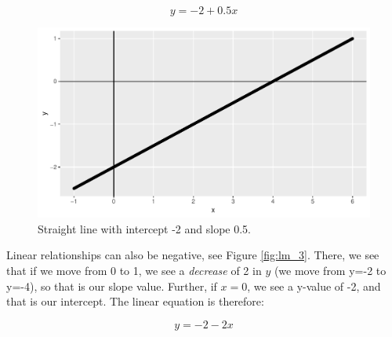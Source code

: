\documentclass[]{report}\usepackage[]{graphicx}\usepackage[]{color}
\makeatletter
\def\maxwidth{ %
  \ifdim\Gin@nat@width>\linewidth
    \linewidth
  \else
    \Gin@nat@width
  \fi
}
\newenvironment{knitrout}{}{} %
\makeatother
\begin{document}
\begin{equation}
y = -2 + 0.5 x
\end{equation}



\begin{knitrout}
\color{fgcolor}\begin{figure}

{\centering \includegraphics[width=\maxwidth]{figure/lm_2-1} 

}

\caption[Straight line with intercept -2 and slope 0.5]{Straight line with intercept -2 and slope 0.5.}\label{fig:lm_2}
\end{figure}


\end{knitrout}


Linear relationships can also be negative, see Figure \ref{fig:lm_3}. There, we see that if we move from 0 to 1, we see a \textit{decrease} of 2 in $y$ (we move from y=-2 to y=-4), so that is our slope value. Further, if $x=0$, we see a y-value of -2, and that is our intercept. The linear equation is therefore:

\begin{equation}
y = -2 - 2 x
\end{equation}
\end{document}
